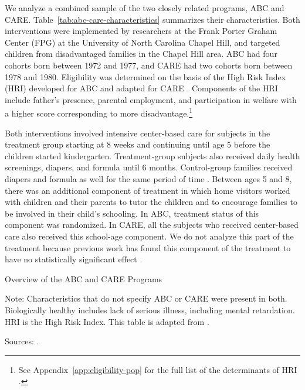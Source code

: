 We analyze a combined sample of the two closely related programs, ABC and CARE. Table~\ref{tab:abc-care-characteristics} summarizes their characteristics. Both interventions were implemented by researchers at the Frank Porter Graham Center (FPG) at the University of North Carolina Chapel Hill, and targeted children from disadvantaged families in the Chapel Hill area. ABC had four cohorts born between 1972 and 1977, and CARE had two cohorts born between 1978 and 1980. Eligibility was determined on the basis of the High Risk Index (HRI) developed for ABC and adapted for CARE \citep{Campbell_Wasik_etal_2008_ECRQ}. Components of the HRI include father's presence, parental employment, and participation in welfare with a higher score corresponding to more disadvantage.\footnote{See Appendix~\ref{app:eligibility-pop} for the full list of the determinants of HRI \citep{Ramey_Smith_1977_AJMD, Wasik_Ramey_etal_1990_CD, Ramey_Campbell_1991_childreninpoverty}.}

Both interventions involved intensive center-based care for subjects in the treatment group starting at 8 weeks and continuing until age 5 before the children started kindergarten. Treatment-group subjects also received daily health screenings, diapers, and formula until 6 months. Control-group families received diapers and formula as well for the same period of time \citep{Wasik_Ramey_etal_1990_CD,Ramey_Campbell_1991_childreninpoverty}. Between ages 5 and 8, there was an additional component of treatment in which home visitors worked with children and their parents to tutor the children and to encourage families to be involved in their child's schooling. In ABC, treatment status of this component was randomized. In CARE, all the subjects who received center-based care also received this school-age component. We do not analyze this part of the treatment because previous work has found this component of the treatment to have no statistically significant effect \citep{Campbell_Ramey_etal_2002_ADS,Campbell_Conti_etal_2014_EarlyChildhoodInvestments}.

\begin{table}[H]
\centering
\caption{Overview of the ABC and CARE Programs}
\label{tab:abc-care-characteristics}
\begin{threeparttable}
	
\begin{tablenotes}
\footnotesize
\item Note: Characteristics that do not specify ABC or CARE were present in both. Biologically healthy includes lack of serious illness, including mental retardation. HRI is the High Risk Index. This table is adapted from \citet{Elango_Hojman_etal_2016_Early-Edu}. \\
\item Sources: \citet{Ramey_Collier_etal_1976_CarolinaAbecedarianProject,Ramey_Smith_1977_AJMD,Ramey_etal_1985_Project-CARE_TiECSE,Wasik_Ramey_etal_1990_CD,Ramey_Campbell_1991_childreninpoverty}. 
\end{tablenotes}
\end{threeparttable}
\end{table}

